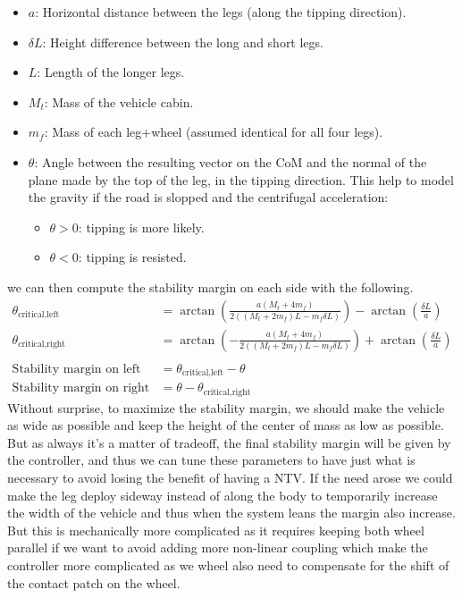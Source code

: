 \begin{itemize}
  \item $a$: Horizontal distance between the legs (along the tipping direction).
  \item $\delta L$: Height difference between the long and short legs.
  \item $L$: Length of the longer legs.
  \item $M_t$: Mass of the vehicle cabin.
  \item $m_f$: Mass of each leg+wheel (assumed identical for all four legs).
  \item $\theta$: Angle between the resulting vector on the CoM and the normal of the plane made by the top of the leg, in the tipping direction. This help to model the gravity if the road is slopped and the centrifugal acceleration:
    \begin{itemize}
      \item $\theta > 0$: tipping is more likely.
      \item $\theta < 0$: tipping is resisted.
    \end{itemize}
\end{itemize}
we can then compute the stability margin on each side with the following.
\begin{align*}
\theta_{\text{critical,left}} &= \arctan\left(\frac{a \left(M_t + 4m_f\right)}{2 \left( (M_t + 2m_f)L - m_f \delta L \right)}\right) - \arctan\left(\frac{\delta L}{a}\right)\\
\theta_{\text{critical,right}} &= \arctan\left(-\frac{a \left(M_t + 4m_f\right)}{2 \left( (M_t + 2m_f)L - m_f \delta L \right)}\right) + \arctan\left(\frac{\delta L}{a}\right) \\
\\
\text{Stability margin on left side} &= \theta_{\text{critical,left}} - \theta \\
\text{Stability margin on right side} &= \theta - \theta_{\text{critical,right}}
\end{align*}
Without surprise, to maximize the stability margin, we should make the vehicle as wide as possible and keep the height of the center of mass as low as possible. But as always it's a matter of tradeoff, the final stability margin will be given by the controller, and thus we can tune these parameters to have just what is necessary to avoid losing the benefit of having a NTV. If the need arose we could make the leg deploy sideway instead of along the body to temporarily increase the width of the vehicle and thus when the system leans the margin also increase. But this is mechanically more complicated as it requires keeping both wheel parallel if we want to avoid adding more non-linear coupling which make the controller more complicated as we wheel also need to compensate for the shift of the contact patch on the wheel.